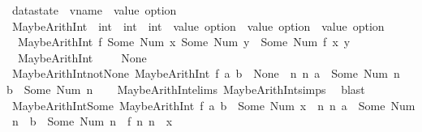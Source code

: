 \begin{isabellebody}
\isamarkupfalse%
\ datastate\ {\isacharequal}\ {\isachardoublequoteopen}vname\ {\isasymRightarrow}\ value\ option{\isachardoublequoteclose}%
\isamarkupfalse%
\ MaybeArithInt\ {\isacharcolon}{\isacharcolon}\ {\isachardoublequoteopen}{\isacharparenleft}int\ {\isasymRightarrow}\ int\ {\isasymRightarrow}\ int{\isacharparenright}\ {\isasymRightarrow}\ value\ option\ {\isasymRightarrow}\ value\ option\ {\isasymRightarrow}\ value\ option{\isachardoublequoteclose}\ \isanewline
\ \ {\isachardoublequoteopen}MaybeArithInt\ f\ {\isacharparenleft}Some\ {\isacharparenleft}Num\ x{\isacharparenright}{\isacharparenright}\ {\isacharparenleft}Some\ {\isacharparenleft}Num\ y{\isacharparenright}{\isacharparenright}\ {\isacharequal}\ Some\ {\isacharparenleft}Num\ {\isacharparenleft}f\ x\ y{\isacharparenright}{\isacharparenright}{\isachardoublequoteclose}\ {\isacharbar}\isanewline
\ \ {\isachardoublequoteopen}MaybeArithInt\ {\isacharunderscore}\ {\isacharunderscore}\ {\isacharunderscore}\ {\isacharequal}\ None{\isachardoublequoteclose}\isanewline
\isanewline
{}\isamarkupfalse%
\ MaybeArithInt{\isacharunderscore}not{\isacharunderscore}None{\isacharcolon}\ {\isachardoublequoteopen}MaybeArithInt\ f\ a\ b\ {\isasymnoteq}\ None\ {\isacharequal}\ {\isacharparenleft}{\isasymexists}n\ n{\isacharprime}{\isachardot}\ a\ {\isacharequal}\ Some\ {\isacharparenleft}Num\ n{\isacharparenright}\ {\isasymand}\ b\ {\isacharequal}\ Some\ {\isacharparenleft}Num\ n{\isacharprime}{\isacharparenright}{\isacharparenright}{\isachardoublequoteclose}\isanewline
%
\isadelimproof
\ \ %
\endisadelimproof
%
\isatagproof
{}\isamarkupfalse%
\ MaybeArithInt{\isachardot}elims\ MaybeArithInt{\isachardot}simps{\isacharparenleft}{}{\isacharparenright}\ \isamarkupfalse%
\ blast%
\endisatagproof
{\isafoldproof}%
%
\isadelimproof
\isanewline
%
\endisadelimproof
\isanewline
{}\isamarkupfalse%
\ MaybeArithInt{\isacharunderscore}Some{\isacharcolon}\ {\isachardoublequoteopen}MaybeArithInt\ f\ a\ b\ {\isacharequal}\ Some\ {\isacharparenleft}Num\ x{\isacharparenright}\ {\isacharequal}\ {\isacharparenleft}{\isasymexists}n\ n{\isacharprime}{\isachardot}\ a\ {\isacharequal}\ Some\ {\isacharparenleft}Num\ n{\isacharparenright}\ {\isasymand}\ b\ {\isacharequal}\ Some\ {\isacharparenleft}Num\ n{\isacharprime}{\isacharparenright}\ {\isasymand}\ f\ n\ n{\isacharprime}\ {\isacharequal}\ x{\isacharparenright}{\isachardoublequoteclose}\isanewline

\end{isabellebody}
